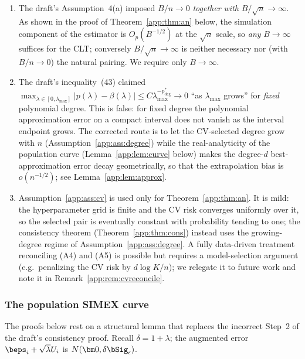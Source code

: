\begin{remark}
\leavevmode
\begin{enumerate}\itemsep2pt
\item[(i)] The draft's Assumption~4(a) imposed $B/n\to 0$ \emph{together
with} $B/\sqrt n\to\infty$. As shown in the proof of Theorem~\ref{app:thm:an}
below, the simulation component of the \asimex{} estimator is
$O_p(B^{-1/2})$ at the $\sqrt n$ scale, so \emph{any} $B\to\infty$
suffices for the CLT; conversely $B/\sqrt n\to\infty$ is neither necessary
nor (with $B/n\to 0$) the natural pairing. We require only $B\to\infty$.
\item[(ii)] The draft's inequality~(43) claimed
$\max_{\lambda\in[0,\lambda_{\max}]}|p(\lambda)-\beta(\lambda)|
\le C\lambda_{\max}^{-p^*_{\deg}}\to 0$ ``as $\lambda_{\max}$ grows'' for
\emph{fixed} polynomial degree. This is false: for fixed degree the
polynomial approximation error on a compact interval does not vanish as the
interval endpoint grows. The corrected route is to let the CV-selected
degree grow with $n$ (Assumption~\ref{app:ass:degree}) while the real-analyticity
of the population curve (Lemma~\ref{app:lem:curve} below) makes the
degree-$d$ best-approximation error decay geometrically, so that the
extrapolation bias is $o(n^{-1/2})$; see Lemma~\ref{app:lem:approx}.
\item[(iii)] Assumption~\ref{app:ass:cv} is used only for Theorem~\ref{app:thm:an}.
It is mild: the hyperparameter grid is finite and the CV risk converges
uniformly over it, so the selected pair is eventually constant with
probability tending to one; the consistency theorem
(Theorem~\ref{app:thm:cons}) instead uses the growing-degree regime of
Assumption~\ref{app:ass:degree}. A fully data-driven treatment reconciling
(A4) and (A5) is possible but requires a model-selection argument
(e.g.\ penalizing the CV risk by $d\log K/n$); we relegate it to future
work and note it in Remark~\ref{app:rem:cvreconcile}.
\end{enumerate}
\end{remark}

\subsubsection{The population SIMEX curve}\label{app:sec:population}

The proofs below rest on a structural lemma that replaces the incorrect
Step~2 of the draft's consistency proof. Recall
$\delta=1+\lambda$; the augmented error $\beps_i+\sqrt\lambda U_i$ is
$N(\bm 0,\delta\bSig_\epsilon)$.

